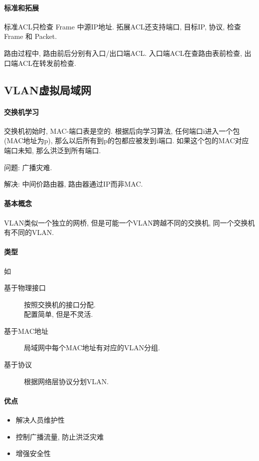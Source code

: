 \documentclass{ctexart}
\begin{document}
\paragraph{标准和拓展} 标准ACL只检查 Frame 中源IP地址.
    拓展ACL还支持端口, 目标IP, 协议, 检查 Frame 和 Packet.\par
    路由过程中, 路由前后分别有入口/出口端ACL. 入口端ACL在查路由表前检查, 出口端ACL在转发前检查.

\subsection{VLAN虚拟局域网}
\paragraph{交换机学习} 交换机初始时, MAC-端口表是空的.
    根据后向学习算法, 
    任何端口i进入一个包 (MAC地址为p), 那么以后所有到p的包都应被发到i端口.
    如果这个包的MAC对应端口未知, 那么洪泛到所有端口.\par
    问题: 广播灾难.\par
    解决: 中间价路由器, 路由器通过IP而非MAC.\par
\paragraph{基本概念} VLAN类似一个独立的网桥, 但是可能一个VLAN跨越不同的交换机, 同一个交换机有不同的VLAN.
\paragraph{类型} 如 \begin{description} 
        \item[基于物理接口] 按照交换机的接口分配.\\ 配置简单, 但是不灵活.
        \item[基于MAC地址] 局域网中每个MAC地址有对应的VLAN分组.
        \item[基于协议] 根据网络层协议分划VLAN.
    \end{description}
\paragraph{优点} \begin{itemize}
        \item 解决人员维护性
        \item 控制广播流量, 防止洪泛灾难
        \item 增强安全性
    \end{itemize}
\end{document}
